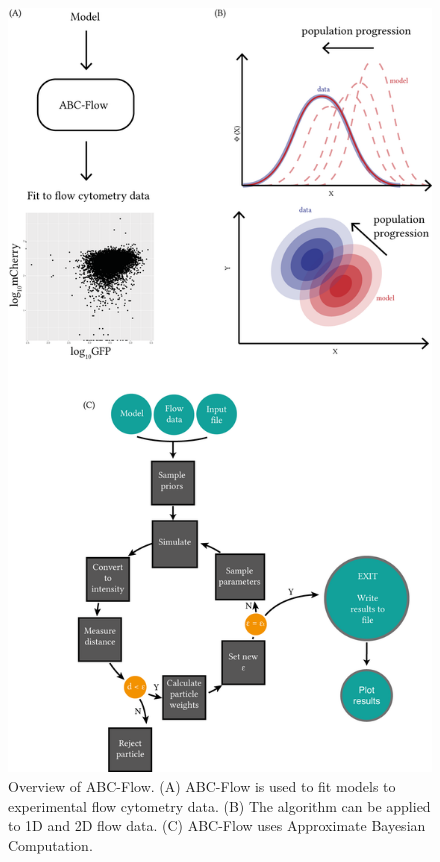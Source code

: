 \begin{figure}[htbp]
	\begin{center}
		\includegraphics[scale=1.1]{../../chapters/chapterABCFlow/images/abc-flow-overv.png}
		\caption[ABC-Flow algorithm overview]{\label{fig:abcflow-overv}Overview of ABC-Flow. (A) ABC-Flow is used to fit models to experimental flow cytometry data. (B) The algorithm can be applied to 1D and 2D flow data. (C) ABC-Flow uses Approximate Bayesian Computation.}
	\end{center}
\end{figure}

